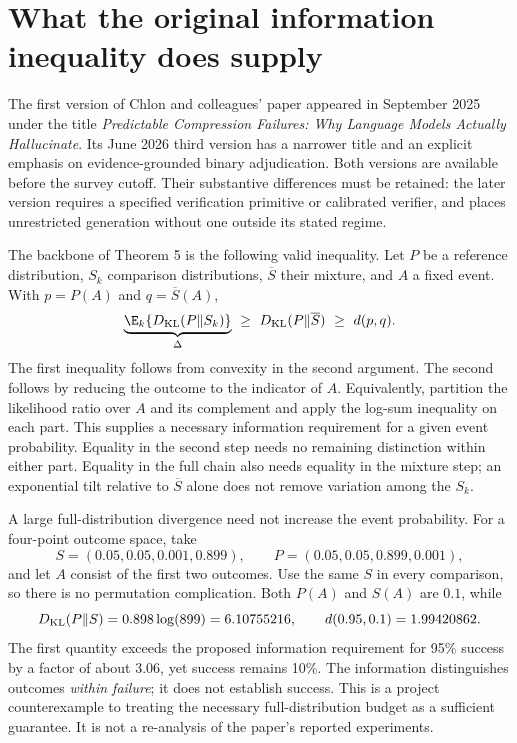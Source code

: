 \section{What the original information inequality does supply}

The first version of Chlon and colleagues' paper appeared in September 2025
under the title \emph{Predictable Compression Failures: Why Language Models
Actually Hallucinate}. Its June 2026 third version has a narrower title and
an explicit emphasis on evidence-grounded binary adjudication. Both versions
are available before the survey cutoff. Their substantive differences must
be retained: the later version requires a specified verification primitive
or calibrated verifier, and places unrestricted generation without one
outside its stated regime.
\citep{closure30chlonone,closure30chlonthree}

The backbone of Theorem 5 is the following valid inequality. Let $P$ be a
reference distribution, $S_k$ comparison distributions, $\overline S$ their
mixture, and $A$ a fixed event. With $p=P(A)$ and $q=\overline S(A)$,
\begin{equation}
 \underbrace{\E_k\{D_{\rm KL}(P\Vert S_k)\}}_{\Delta}
 \ \geq\ D_{\rm KL}(P\Vert\overline S)
 \ \geq\ d(p,q).
 \label{closure30:information-chain}
\end{equation}
The first inequality follows from convexity in the second argument. The
second follows by reducing the outcome to the indicator of $A$. Equivalently,
partition the likelihood ratio over $A$ and its complement and apply the
log-sum inequality on each part. This supplies a necessary information
requirement for a given event probability. Equality in the second step needs
no remaining distinction within either part. Equality in the full chain also
needs equality in the mixture step; an exponential tilt relative to
$\overline S$ alone does not remove variation among the $S_k$.
\citep[Theorem 5 and Appendix A.4]{closure30chlonone,closure30chlonthree}

A large full-distribution divergence need not increase the event probability.
For a four-point outcome space, take
\begin{equation}
 S=(0.05,0.05,0.001,0.899),\qquad
 P=(0.05,0.05,0.899,0.001),
 \label{closure30:irrelevant-information}
\end{equation}
and let $A$ consist of the first two outcomes. Use the same $S$ in every
comparison, so there is no permutation complication. Both $P(A)$ and $S(A)$
are $0.1$, while
\begin{equation}
 D_{\rm KL}(P\Vert S)=0.898\log(899)=6.10755216,
 \qquad d(0.95,0.1)=1.99420862.
 \label{closure30:budget-counterexample}
\end{equation}
The first quantity exceeds the proposed information requirement for 95\%
success by a factor of about 3.06, yet success remains 10\%. The information
distinguishes outcomes \emph{within failure}; it does not establish success.
This is a project counterexample to treating the necessary full-distribution
budget as a sufficient guarantee. It is not a re-analysis of the paper's
reported experiments.

